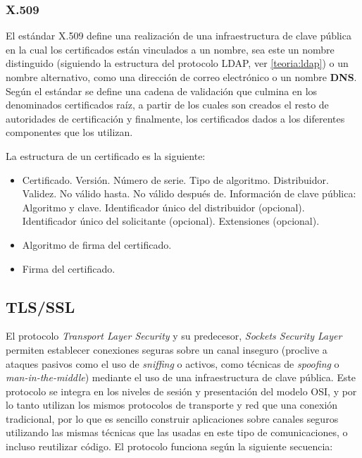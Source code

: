 \subsubsection{X.509}

El estándar X.509\label{rfc4158} define una realización de una infraestructura de clave pública en la cual los certificados están vinculados a un nombre, sea este un nombre distinguido (siguiendo la estructura del protocolo LDAP, ver \ref{teoria:ldap}) o un nombre alternativo, como una dirección de correo electrónico o un nombre \textbf{DNS}. Según el estándar se define una cadena de validación que culmina en los denominados certificados raíz, a partir de los cuales son creados el resto de autoridades de certificación y finalmente, los certificados dados a los diferentes componentes que los utilizan.

La estructura de un certificado es la siguiente\label{rfc5280}:

\begin{itemize}
  \item Certificado.
    \subitem Versión.
    \subitem Número de serie.
    \subitem Tipo de algoritmo.
    \subitem Distribuidor.
    \subitem Validez.
      \subsubitem No válido hasta.
      \subsubitem No válido después de.
    \subitem Información de clave pública: Algoritmo y clave.
    \subitem Identificador único del distribuidor (opcional).
    \subitem Identificador único del solicitante (opcional).
    \subitem Extensiones (opcional).
  \item Algoritmo de firma del certificado.
  \item Firma del certificado.
\end{itemize}

\subsection{TLS/SSL}
El protocolo \textit{Transport Layer Security}\cite{rfc5246} y su predecesor, \textit{Sockets Security Layer} permiten establecer conexiones seguras sobre un canal inseguro (proclive a ataques pasivos como el uso de \textit{sniffing} o activos, como técnicas de \textit{spoofing} o \textit{man-in-the-middle}) mediante el uso de una infraestructura de clave pública. Este protocolo se integra en los niveles de sesión y presentación del modelo OSI, y por lo tanto utilizan los mismos protocolos de transporte y red que una conexión tradicional, por lo que es sencillo construir aplicaciones sobre canales seguros utilizando las mismas técnicas que las usadas en este tipo de comunicaciones, o incluso reutilizar código. El protocolo funciona según la siguiente secuencia:


